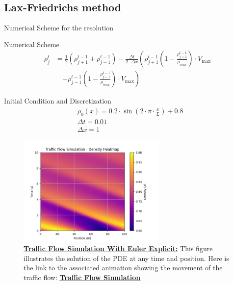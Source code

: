 \documentclass{beamer}
\begin{document}
\subsection{Lax-Friedrichs method}
\begin{frame}{Numerical Scheme for the resolution}
	\begin{alertblock}{Numerical Scheme}
		\begin{equation*}
			\begin{split}
				\rho_{j}^t &= \frac{1}{2} \left(\rho_{j+1}^{t-1} + \rho_{j-1}^{t-1}\right) 
			 - \frac{\Delta t}{2 \cdot \Delta x} \left( \rho_{j+1}^{t-1} \left(1 - \frac{\rho_{j+1}^{t-1}}{\rho_{max}}\right) \cdot V_{\text{max}} \right. \\
				&\quad \left. - \rho_{j-1}^{t-1} \left(1 - \frac{\rho_{j-1}^{t-1}}{\rho_{max}}\right) \cdot V_{\text{max}} \right)
			\end{split}
		\end{equation*}
		
	\end{alertblock}
	\begin{block}{Initial Condition and Discretization}
		\[
		\boxed{
			\begin{aligned}
				&\rho_0(x)=0.2 \cdot \sin\left(2 \cdot \pi \cdot \frac{x}{L}\right) + 0.8 \\
				&\Delta t = 0.01 \\
				&\Delta x = 1
			\end{aligned}
		}
		\]
	\end{block}
	
\end{frame}


\begin{frame}
	\begin{figure}[H]
		\centering
		\includegraphics[width=0.65\textwidth]{traffic_flow_density_map_LF.png}
		\caption[Traffic Flow Simulation With Euler Explicit]{\textbf{\underline{Traffic Flow Simulation With Euler Explicit:}} This figure illustrates the solution of the PDE at any time and position. Here is the link to the associated animation showing the movement of the traffic flow: \href{https://github.com/FlorentGerbaud/Simple-road-traffic-modeling/blob/Flo-PDE/SRTM/EDPMethod/CasTestToLaunch/TestToLaunch/Modele_IC_S/LaxFriedrichs/traffic_flow_animation.gif}{\textbf{\underline{Traffic Flow Simulation}}} }
		\label{fig:traffic_flow_density_map}
	\end{figure}
\end{frame}
\end{document}
